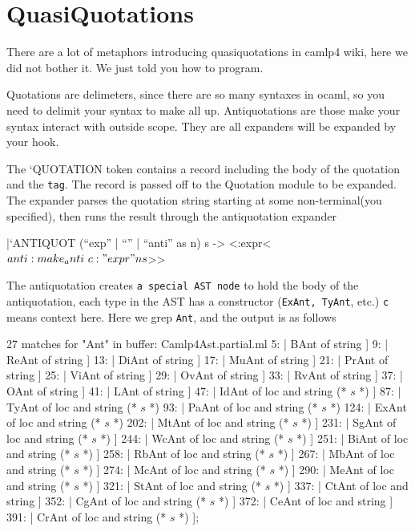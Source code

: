 \section{QuasiQuotations}

There are a lot of metaphors introducing quasiquotations in camlp4
wiki, here we did not bother it. We just told you how to program.

Quotations are delimeters, since there are so many syntaxes in ocaml,
so you need to delimit your syntax to make all up. Antiquotations are
those make your syntax interact with outside scope. They are all
expanders will be expanded by your hook.

\begin{ocamlcode}
\end{ocamlcode}

The `QUOTATION token contains a record including the body of the
quotation and the \verb|tag|. The record is passed off to the
Quotation module to be expanded. The expander parses the quotation
string starting at some non-terminal(you specified), then runs the
result through the antiquotation expander

\begin{ocamlcode}
  |`ANTIQUOT (``exp'' | ``'' | ``anti'' as n) s ->
  <:expr< $anti:make_anti ~c:"expr" n s $>>
\end{ocamlcode}

The antiquotation creates \verb|a special AST node| to hold the body of the
antiquotation, each type in the AST has a constructor (\verb|ExAnt, TyAnt|,
etc.) \verb|c|  means context here.
Here we grep \verb|Ant|, and the output is as follows

\begin{bluetext}
  27 matches for "Ant" in buffer: Camlp4Ast.partial.ml
      5:    | BAnt of string ]
      9:    | ReAnt of string ]
     13:    | DiAnt of string ]
     17:    | MuAnt of string ]
     21:    | PrAnt of string ]
     25:    | ViAnt of string ]
     29:    | OvAnt of string ]
     33:    | RvAnt of string ]
     37:    | OAnt of string ]
     41:    | LAnt of string ]
     47:    | IdAnt of loc and string (* $s$ *) ]
     87:    | TyAnt of loc and string (* $s$ *)
     93:    | PaAnt of loc and string (* $s$ *)
    124:    | ExAnt of loc and string (* $s$ *)
    202:    | MtAnt of loc and string (* $s$ *) ]
    231:    | SgAnt of loc and string (* $s$ *) ]
    244:    | WcAnt of loc and string (* $s$ *) ]
    251:    | BiAnt of loc and string (* $s$ *) ]
    258:    | RbAnt of loc and string (* $s$ *) ]
    267:    | MbAnt of loc and string (* $s$ *) ]
    274:    | McAnt of loc and string (* $s$ *) ]
    290:    | MeAnt of loc and string (* $s$ *) ]
    321:    | StAnt of loc and string (* $s$ *) ]
    337:    | CtAnt of loc and string ]
    352:    | CgAnt of loc and string (* $s$ *) ]
    372:    | CeAnt of loc and string ]
    391:    | CrAnt of loc and string (* $s$ *) ];
\end{bluetext}

